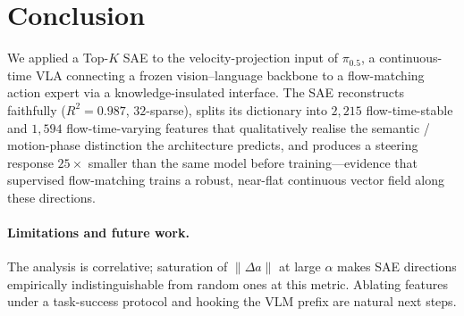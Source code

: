 \section{Conclusion}
\label{sec:conclusion}

We applied a Top-$K$ SAE to the velocity-projection input of $\pi_{0.5}$, a
continuous-time VLA connecting a frozen vision--language backbone to a
flow-matching action expert via a knowledge-insulated interface. The SAE
reconstructs faithfully ($R^2{=}0.987$, $32$-sparse), splits its dictionary
into $2{,}215$ flow-time-stable and $1{,}594$ flow-time-varying features
that qualitatively realise the semantic / motion-phase distinction the
architecture predicts, and produces a steering response $25{\times}$ smaller
than the same model before training---evidence that supervised flow-matching
trains a robust, near-flat continuous vector field along these directions.

\paragraph{Limitations and future work.}
The analysis is correlative; saturation of $\|\Delta a\|$ at large $\alpha$
makes SAE directions empirically indistinguishable from random ones at this
metric. Ablating features under a task-success protocol and hooking the VLM
prefix are natural next steps.
